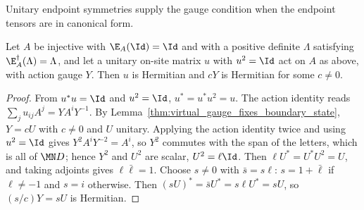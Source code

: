 Unitary endpoint symmetries supply the gauge condition when the endpoint
tensors are in canonical form.

\begin{lemma}
    \label{thm:mpo_arbitrary_canonical_hermitian_gauge}
    \leanok
    Let $A$ be injective with $\E_A(\Id)=\Id$ and with a positive definite
    $\Lambda$ satisfying $\E_A^\dagger(\Lambda)=\Lambda$, and let a unitary
    on-site matrix $u$ with $u^2=\Id$ act on $A$ as above, with action
    gauge $Y$. Then $u$ is Hermitian and $cY$ is Hermitian for some
    $c\neq0$.
\end{lemma}
\begin{proof}
    \leanok
    From $u^*u=\Id$ and $u^2=\Id$, $u^*=u^*u^2=u$. The action identity reads
    $\sum_ju_{ij}A^j=YA^iY^{-1}$. By
    Lemma~\ref{thm:virtual_gauge_fixes_boundary_state}, $Y=cU$ with $c\neq0$
    and $U$ unitary. Applying the action identity twice and using $u^2=\Id$
    gives $Y^2A^iY^{-2}=A^i$, so $Y^2$ commutes with the span of the
    letters, which is all of $\MN D$; hence $Y^2$ and $U^2$ are scalar,
    $U^2=\ell\Id$. Then $\ell U^*=U^*U^2=U$, and taking adjoints gives
    $\ell\bar\ell=1$. Choose $s\neq0$ with $\bar s=s\ell$: $s=1+\bar\ell$ if
    $\ell\neq-1$ and $s=i$ otherwise. Then $(sU)^*=\bar sU^*=s\ell U^*=sU$,
    so $(s/c)Y=sU$ is Hermitian.
\end{proof}

